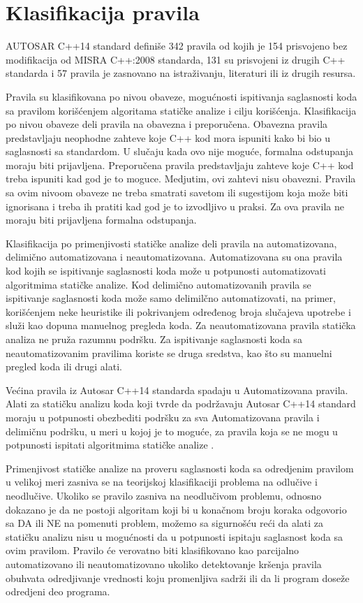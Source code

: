 \documentclass[12pt,oneside]{memoir}
\begin{document}
\section{Klasifikacija pravila}
AUTOSAR C++14 standard definiše 342 pravila od kojih je 154 prisvojeno bez modifikacija od MISRA C++:2008 standarda, 131 su prisvojeni
iz drugih C++ standarda i 57 pravila je zasnovano na istraživanju, literaturi ili iz drugih resursa.

Pravila su klasifikovana po nivou obaveze, mogućnosti ispitivanja saglasnosti koda sa pravilom korišćenjem algoritama
statičke analize i cilju korišćenja.
\indent
Klasifikacija po nivou obaveze deli pravila na obavezna i preporučena.
Obavezna pravila predstavljaju neophodne zahteve koje C++ kod mora ispuniti kako bi bio u saglasnosti sa standardom. U slučaju kada ovo nije moguće,
formalna odstupanja moraju biti prijavljena.
Preporučena pravila predstavljaju zahteve koje C++ kod treba ispuniti kad god je to moguce. Medjutim, ovi zahtevi nisu obavezni. Pravila
sa ovim nivoom obaveze ne treba smatrati savetom ili sugestijom koja može biti ignorisana i treba ih pratiti kad god je to 
izvodljivo u praksi. Za ova pravila ne moraju biti prijavljena formalna odstupanja.

Klasifikacija po primenjivosti statičke analize deli pravila na automatizovana, delimično automatizovana i neautomatizovana.
Automatizovana su ona pravila kod kojih se ispitivanje saglasnosti koda može u potpunosti automatizovati algoritmima statičke analize.
Kod delimično automatizovanih pravila se ispitivanje saglasnosti koda može samo delimilčno automatizovati, na primer, korišćenjem neke heuristike ili pokrivanjem određenog broja slučajeva upotrebe i služi kao dopuna manuelnog pregleda koda.
Za neautomatizovana pravila statička analiza ne pruža razumnu podršku. Za ispitivanje saglasnosti koda sa neautomatizovanim pravilima koriste se druga sredstva, kao što su manuelni pregled koda ili drugi alati.

\indent
Većina pravila iz Autosar C++14 standarda spadaju u Automatizovana pravila. Alati za statičku analizu koda koji tvrde da podržavaju Autosar C++14 standard moraju u potpunosti obezbediti podršku za sva Automatizovana pravila i delimičnu podršku, u meri u kojoj je to moguće, za pravila koja se ne mogu u potpunosti ispitati algoritmima statičke analize \cite{AutosarGuidelines}.

\indent
Primenjivost statičke analize na proveru saglasnosti koda sa odredjenim pravilom u velikoj meri zasniva se na teorijskoj klasifikaciji problema
na odlučive i neodlučive. Ukoliko se pravilo zasniva na neodlučivom problemu, odnosno dokazano je da ne postoji algoritam koji bi u konačnom broju koraka odgovorio sa DA ili NE na pomenuti problem, možemo sa sigurnošću reći da alati za statičku analizu nisu u mogućnosti da u
potpunosti ispitaju saglasnost koda sa ovim pravilom. Pravilo će verovatno biti klasifikovano kao parcijalno automatizovano ili neautomatizovano ukoliko detektovanje kršenja pravila obuhvata odredjivanje vrednosti koju promenljiva sadrži ili da li program doseže odredjeni deo programa.
\end{document}
